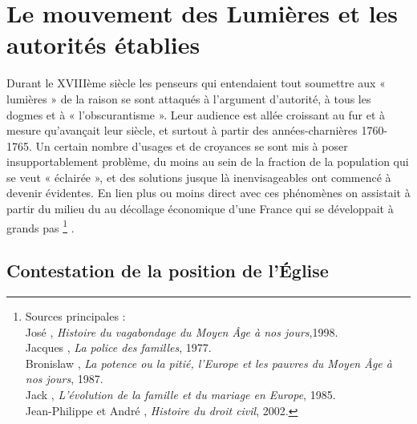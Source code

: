 

\chapter[Le mouvement des Lumières et les autorités établies]{Le mouvement des Lumières et les autorités établies}


 Durant le XVIIIème siècle les penseurs qui entendaient tout soumettre aux « lumières » de la raison se sont attaqués à l'argument d'autorité, à tous les dogmes et à « l'obscurantisme ». Leur audience est allée croissant au fur et à mesure qu'avançait leur siècle, et surtout à partir des années-charnières 1760-1765. Un certain nombre d'usages et de croyances se sont mis à poser insupportablement problème, du moins au sein de la fraction de la population qui se veut « éclairée », et des solutions jusque là inenvisageables ont commencé à devenir évidentes. En lien plus ou moins direct avec ces phénomènes on assistait à partir du milieu du  au décollage économique d'une France qui se développait à grands pas%
\footnote{Sources principales :
\\José , \emph{Histoire du vagabondage du Moyen Âge à nos jours},1998.
\\Jacques {}, \emph{La police des familles}, 1977.
\\Bronislaw {}, \emph{La potence ou la pitié, l'Europe et les pauvres du Moyen Âge à nos jours}, 1987.
\\Jack {}, \emph{L'évolution de la famille et du mariage en Europe}, 1985.
\\Jean-Philippe  et André , \emph{Histoire du droit civil}, 2002.}%
.

 
\section{Contestation de la position de l'Église}

